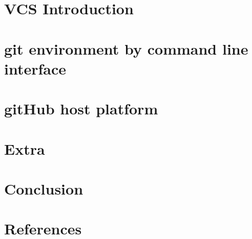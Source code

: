 \documentclass{beamer}
\begin{document}
\section{VCS Introduction}


\section{git environment by command line interface}
%

\section{gitHub host platform}
%

\section{Extra}
%

\section{Conclusion}
%

\section*{References}

\end{document}
